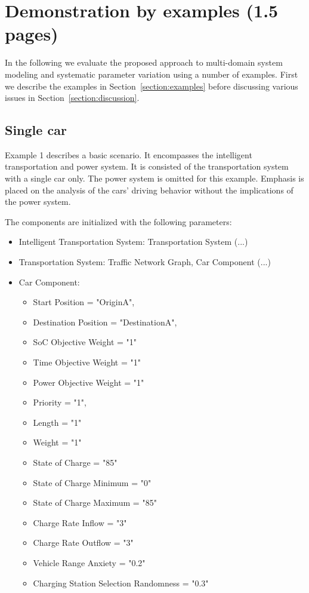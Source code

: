 \section{Demonstration by examples (1.5 pages)}
\label{section:evaluation}

In the following we evaluate the proposed approach to multi-domain system modeling and systematic parameter variation using a number of examples. First we describe the examples in Section~\ref{section:examples} before discussing various issues in Section~\ref{section:discussion}.

\subsection{Single car}
Example 1 describes a basic scenario. It encompasses the intelligent transportation and power system. It is consisted of the transportation system with a single car only. The power system is omitted for this example.
Emphasis is placed on the analysis of the cars' driving behavior without the implications of the power system. 

The components are initialized with the following parameters:

\begin{itemize}
	\item Intelligent Transportation System: Transportation System (...)
	\item Transportation System: Traffic Network Graph, Car Component (...)
	\item Car Component:
	\begin{itemize}  
		\item Start Position = "OriginA", 
		\item Destination Position = "DestinationA",
		\item SoC Objective Weight = "1" 
		\item Time Objective Weight = "1" 
		\item Power Objective Weight = "1"
		\item Priority = "1",
		\item Length = "1"
		\item Weight = "1"
		\item State of Charge = "85"
		\item State of Charge Minimum = "0"
		\item State of Charge Maximum = "85" 
		\item Charge Rate Inflow = "3" 
		\item Charge Rate Outflow = "3" 
		\item Vehicle Range Anxiety = "0.2" 
		\item Charging Station Selection Randomness = "0.3"
	\end{itemize}
\end{itemize}

